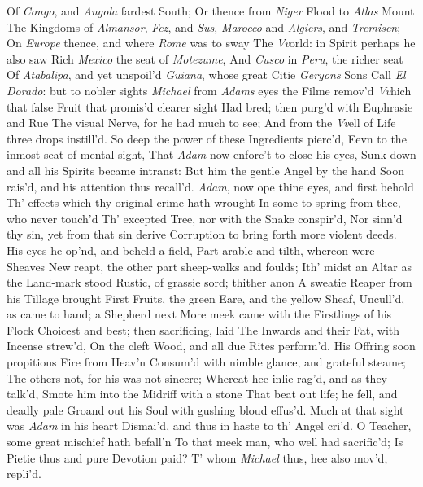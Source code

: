 \documentclass[11pt]{book}
\newcounter {first}
\begin{document}
Of \textit{Congo}, and \textit{Angola} fardest South; 
Or thence from \textit{Niger} Flood to \textit{Atlas} Mount 
The Kingdoms of \textit{Almansor}, \textit{Fez}, and \textit{Sus}, 
\textit{Marocco} and \textit{Algiers}, and \textit{Tremisen}; 
On \textit{Europe} thence, and where \textit{Rome} was to sway 
The \textit{Vv}orld: in Spirit perhaps he also saw 
Rich \textit{Mexico} the seat of \textit{Motezume}, 
And \textit{Cusco} in \textit{Peru}, the richer seat 
Of \textit{Atabalipa}, and yet unspoil'd 
\textit{Guiana}, whose great Citie \textit{Geryons} Sons 
Call \textit{El} \textit{Dorado}: but to nobler sights 
\textit{Michael} from \textit{Adams} eyes the Filme remov'd 
\textit{Vv}hich that false Fruit that promis'd clearer sight 
Had bred; then purg'd with Euphrasie and Rue 
The visual Nerve, for he had much to see; 
And from the \textit{Vv}ell of Life three drops instill'd. 
So deep the power of these Ingredients pierc'd, 
Eevn to the inmost seat of mental sight, 
That \textit{Adam} now enforc't to close his eyes, 
Sunk down and all his Spirits became intranst: 
But him the gentle Angel by the hand 
Soon rais'd, and his attention thus recall'd. 
\quad \textit{Adam}, now ope thine eyes, and first behold 
Th' effects which thy original crime hath wrought 
In some to spring from thee, who never touch'd 
Th' excepted Tree, nor with the Snake conspir'd, 
Nor sinn'd thy sin, yet from that sin derive 
Corruption to bring forth more violent deeds. 
\quad His eyes he op'nd, and beheld a field, 
Part arable and tilth, whereon were Sheaves 
New reapt, the other part sheep-walks and foulds; 
Ith' midst an Altar as the Land-mark stood 
Rustic, of grassie sord; thither anon 
A sweatie Reaper from his Tillage brought 
First Fruits, the green Eare, and the yellow Sheaf, 
Uncull'd, as came to hand; a Shepherd next 
More meek came with the Firstlings of his Flock 
Choicest and best; then sacrificing, laid 
The Inwards and their Fat, with Incense strew'd, 
On the cleft Wood, and all due Rites perform'd. 
His Offring soon propitious Fire from Heav'n 
Consum'd with nimble glance, and grateful steame; 
The others not, for his was not sincere; 
Whereat hee inlie rag'd, and as they talk'd, 
Smote him into the Midriff with a stone 
That beat out life; he fell, and deadly pale 
Groand out his Soul with gushing bloud effus'd. 
Much at that sight was \textit{Adam} in his heart 
Dismai'd, and thus in haste to th' Angel cri'd. 
\quad O Teacher, some great mischief hath befall'n 
To that meek man, who well had sacrific'd; 
Is Pietie thus and pure Devotion paid? 
\quad T' whom \textit{Michael} thus, hee also mov'd, repli'd. 
\end{document}
